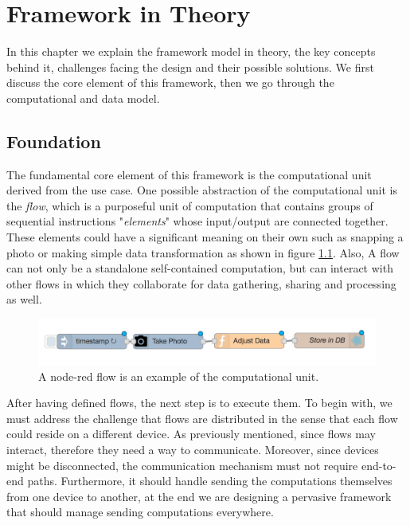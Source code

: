 
\chapter{Framework in Theory}\label{chapter:Foundation}
In this chapter we explain the framework model in theory, the key concepts behind it, challenges facing the design and their possible solutions. We first discuss the core element of this framework, then we go through the computational and data model.


\section{Foundation}
	The fundamental core element of this framework is the computational unit derived from the use case. One possible abstraction of the computational unit is the \textit{flow}, which is a purposeful unit of computation that contains groups of sequential instructions "\textit{elements}" whose input/output are connected together. These elements could have a significant meaning on their own such as snapping a photo or making simple data transformation as shown in figure \ref{fig:flow}. Also, A flow can not only be a standalone self-contained computation, but can interact with other flows in which they collaborate for data gathering, sharing and processing as well.
	
	
\begin{figure}[H]
	\centering
	\includegraphics[scale=0.5]{images/db-out.png} 
	\caption{A node-red flow is an example of the computational unit.}
	\label{fig:flow}
\end{figure}

\noindent After having defined flows, the next step is to execute them. To begin with, we must address the challenge that flows are distributed in the sense that each flow could reside on a different device. As previously mentioned,  since flows may interact, therefore they need a way to communicate. Moreover, since devices might be disconnected,  the communication mechanism must not require end-to-end paths. Furthermore, it  should handle sending the computations themselves from one device to another, at the end we are designing a pervasive framework that should manage sending computations everywhere.\\

